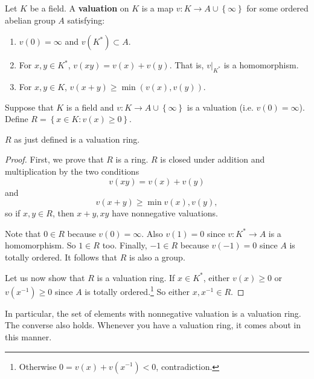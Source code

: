 \begin{definition} 
Let $K$ be a field. A \textbf{valuation} on $K$ is a map $v: K \to A \cup
\left\{\infty\right\}$ for some
 ordered abelian group $A$  satisfying:
\begin{enumerate}
\item  $v(0) = \infty$ and $v(K^*) \subset A$.
\item For $x,y \in K^*$, $v(xy) = v(x) + v(y)$. That is, $v|_{K^*}$ is a homomorphism. 
\item For $x,y \in K$, $v(x+y) \geq \min (v(x), v(y))$. 
\end{enumerate}

\end{definition} 
Suppose that $K$ is a field and $v: K \to A \cup \left\{\infty\right\}$ is a
valuation (i.e. $v(0) = \infty$). Define $R = \left\{x \in K: v(x) \geq
0\right\}$.
\begin{proposition} 
$R$ as just defined is a valuation ring. 
\end{proposition} 
\begin{proof}  First, we prove that $R$ is a ring.
$R$ is closed under addition and multiplication by the two conditions 
\[ v(xy)  = v(x) + v(y)  \]
and
\[ v(x+y) \geq \min v(x), v(y) , \]
so if $x,y \in R$, then $x+y, xy$ have nonnegative valuations. 

Note that $0 \in R$ because $v(0) = \infty$. Also $v(1) = 0$ since $v: K^* \to A$
is a homomorphism. So $1 \in R$ too. 
Finally, $-1 \in R$ because $v(-1) =0$ since $A$ is totally ordered.  It
follows that $R$ is also a group. 

Let us now show that $R$ is a valuation ring. If $x \in K^*$, either $v(x) \geq
0$ or $v(x^{-1}) \geq 0$ since $A$ is totally ordered.\footnote{Otherwise $0
=v(x)+v(x^{-1}) < 0$, contradiction.} So either $x, x^{-1} \in R$.
\end{proof} 

In particular, the set of elements with nonnegative valuation is a valuation
ring.
The converse also holds. Whenever you have a valuation ring, it comes about in
this manner.

